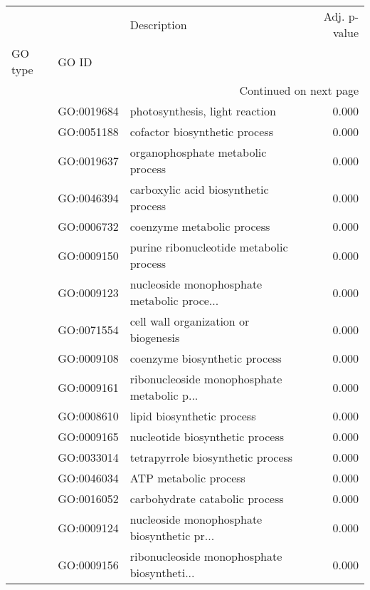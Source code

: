 \begin{longtable}{lllr}
\toprule
   &            &                                  Description &  Adj. p-value \\
GO type & GO ID &                                              &               \\
\midrule
\endhead
\midrule
\multicolumn{4}{r}{{Continued on next page}} \\
\midrule
\endfoot

\bottomrule
\endlastfoot
\multirow{192}{*}{BP} & GO:0019684 &               photosynthesis, light reaction &         0.000 \\
   & GO:0051188 &                cofactor biosynthetic process &         0.000 \\
   & GO:0019637 &            organophosphate metabolic process &         0.000 \\
   & GO:0046394 &         carboxylic acid biosynthetic process &         0.000 \\
   & GO:0006732 &                   coenzyme metabolic process &         0.000 \\
   & GO:0009150 &      purine ribonucleotide metabolic process &         0.000 \\
   & GO:0009123 &  nucleoside monophosphate metabolic proce... &         0.000 \\
   & GO:0071554 &         cell wall organization or biogenesis &         0.000 \\
   & GO:0009108 &                coenzyme biosynthetic process &         0.000 \\
   & GO:0009161 &  ribonucleoside monophosphate metabolic p... &         0.000 \\
   & GO:0008610 &                   lipid biosynthetic process &         0.000 \\
   & GO:0009165 &              nucleotide biosynthetic process &         0.000 \\
   & GO:0033014 &            tetrapyrrole biosynthetic process &         0.000 \\
   & GO:0046034 &                        ATP metabolic process &         0.000 \\
   & GO:0016052 &               carbohydrate catabolic process &         0.000 \\
   & GO:0009124 &  nucleoside monophosphate biosynthetic pr... &         0.000 \\
   & GO:0009156 &  ribonucleoside monophosphate biosyntheti... &         0.000 \\

\end{longtable}
